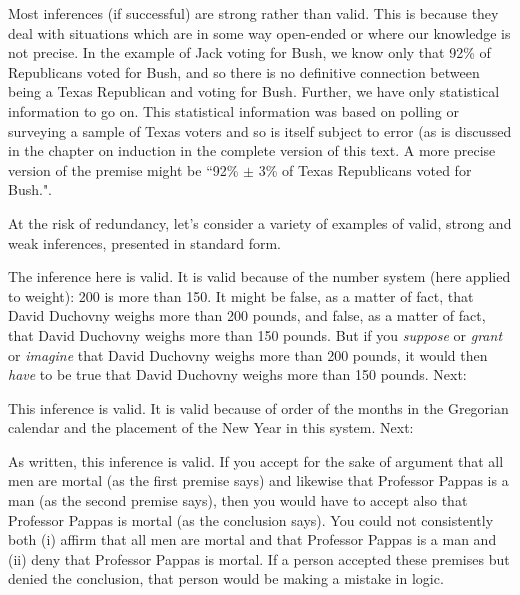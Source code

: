 Most inferences (if successful) are strong rather than valid. This is because they deal with situations which are in some way open-ended or where our knowledge is not precise. In the example of Jack voting for Bush, we know only that 92\% of Republicans voted for Bush, and so there is no definitive connection between being a Texas Republican and voting for Bush. Further, we have only statistical information to go on. This statistical information was based on polling or surveying a sample of Texas voters and so is itself subject to error (as is discussed in the chapter on induction in the complete version of this text. A more precise version of the premise might be ``92\% $\pm$ 3\% of Texas Republicans voted for Bush.".

At the risk of redundancy, let's consider a variety of examples of valid, strong and weak inferences, presented in standard form.

\begin{kormanize}
\end{kormanize}

The inference here is valid. It is valid because of the number system (here applied to weight): 200 is more than 150. It might be false, as a matter of fact, that David Duchovny weighs more than 200 pounds, and false, as a matter of fact, that David Duchovny weighs more than 150 pounds. But if you \textit{suppose }or \textit{grant }or \textit{imagine }that David Duchovny weighs more than 200 pounds, it would then \textit{have }to be true that David Duchovny weighs more than 150 pounds. Next:

\begin{kormanize}
\end{kormanize}

This inference is valid. It is valid because of order of the months in the Gregorian calendar and the placement of the New Year in this system. Next:

\begin{kormanize}
\end{kormanize}

As written, this inference is valid. If you accept for the sake of argument that all men are mortal (as the first premise says) and likewise that Professor Pappas is a man (as the second premise says), then you would have to accept also that Professor Pappas is mortal (as the conclusion says). You could not consistently both (i) affirm that all men are mortal and that Professor Pappas is a man and (ii) deny that Professor Pappas is mortal. If a person accepted these premises but denied the conclusion, that person would be making a mistake in logic.

